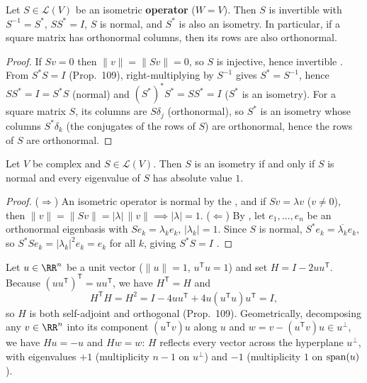 \documentclass[10pt]{scrartcl}
\newcommand{\LL}{\mathcal L}\newcommand{\PP}{\mathcal P}\newcommand{\MM}{\mathcal M}
\begin{document}
\begin{proposition*}
  Let $S\in\LL(V)$ be an isometric \textbf{operator} ($W=V$). Then $S$ is invertible with $S^{-1}=S^*$, $SS^*=I$, $S$ is normal, and $S^*$ is also an isometry. In particular, if a square matrix has orthonormal columns, then its rows are also orthonormal.
\end{proposition*}
\begin{proof}
  If $Sv=0$ then $\|v\|=\|Sv\|=0$, so $S$ is injective, hence invertible . From $S^*S=I$ (Prop.~109), right-multiplying by $S^{-1}$ gives $S^*=S^{-1}$, hence $SS^*=I=S^*S$ (normal) and $(S^*)^*S^*=SS^*=I$ ($S^*$ is an isometry). For a square matrix $S$, its columns are $S\delta_j$ (orthonormal), so $S^*$ is an isometry whose columns $S^*\delta_k$ (the conjugates of the rows of $S$) are orthonormal, hence the rows of $S$ are orthonormal.
\end{proof}

\begin{theorem*}
  Let $V$ be complex and $S\in\LL(V)$. Then $S$ is an isometry if and only if $S$ is normal and every eigenvalue of $S$ has absolute value $1$.
\end{theorem*}
\begin{proof}
  ($\Rightarrow$) An isometric operator is normal by the , and if $Sv=\lambda v$ ($v\neq0$), then $\|v\|=\|Sv\|=|\lambda|\,\|v\|\implies|\lambda|=1$.
  ($\Leftarrow$) By , let $e_1,\dots,e_n$ be an orthonormal eigenbasis with $Se_k=\lambda_k e_k$, $|\lambda_k|=1$. Since $S$ is normal, $S^*e_k=\overline{\lambda_k}e_k$, so $S^*Se_k=|\lambda_k|^2 e_k = e_k$ for all $k$, giving $S^*S=I$ .
\end{proof}

\begin{example*}[Householder reflection $H=I-2uu^{\mathsf T}$]
  Let $u\in\RR^n$ be a unit vector ($\|u\|=1$, $u^{\mathsf T}u=1$) and set $H=I-2uu^{\mathsf T}$. Because $(uu^{\mathsf T})^{\mathsf T}=uu^{\mathsf T}$, we have $H^{\mathsf T}=H$ and
  \[
    H^{\mathsf T}H = H^2 = I - 4uu^{\mathsf T} + 4u(u^{\mathsf T}u)u^{\mathsf T} = I,
  \]
  so $H$ is both self-adjoint and orthogonal (Prop.~109). Geometrically, decomposing any $v\in\RR^n$ into its component $(u^{\mathsf T}v)u$ along $u$ and $w=v-(u^{\mathsf T}v)u\in u^\perp$, we have $Hu=-u$ and $Hw=w$: $H$ reflects every vector across the hyperplane $u^\perp$, with eigenvalues $+1$ (multiplicity $n-1$ on $u^\perp$) and $-1$ (multiplicity $1$ on $\operatorname{span}(u)$).
\end{example*}
\end{document}
